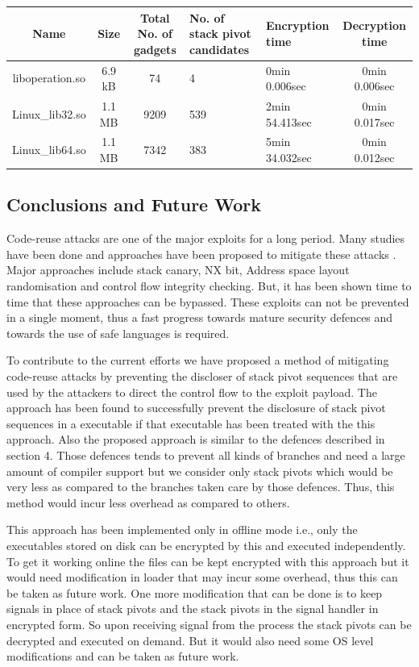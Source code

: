 \documentclass{article}
\begin{document}
\begin{tabular}{|c|c|c|m{2.7cm}|l|c|}
\hline 
Name & Size & Total No. of gadgets & No. of stack pivot candidates & Encryption time & Decryption time \\ 
\hline 
liboperation.so & 6.9 kB & 74 & 4 & 0min 0.006sec & 0min 0.006sec \\ 
\hline 
Linux\_lib32.so & 1.1 MB & 9209 & 539 & 2min 54.413sec & 0min 0.017sec \\ 
\hline 
Linux\_lib64.so & 1.1 MB & 7342 & 383 & 5min 34.032sec & 0min 0.012sec \\ 
\hline 
\end{tabular} 

\begin{multicols}{2}
	\section{Conclusions and Future Work}
	Code-reuse attacks are one of the major exploits for a long period. Many studies have been done and approaches have been proposed to mitigate these attacks \cite{breakdef}\cite{secrvw}\cite{memerr}\cite{marlin}. Major approaches include stack canary, NX bit, Address space layout randomisation and control flow integrity checking. But, it has been shown time to time that these approaches can be bypassed. These exploits can not be prevented in a single moment, thus a fast progress towards mature security defences and towards the use of safe languages is required.
	
	To contribute to the current efforts we have proposed a method of mitigating code-reuse attacks by preventing the discloser of stack pivot sequences that are used by the attackers to direct the control flow to the exploit payload. The approach has been found to successfully prevent the disclosure of stack pivot sequences in a executable if that executable has been treated with the this approach. Also the proposed approach is similar to the defences described in section 4. Those defences tends to prevent all kinds of branches and need a large amount of compiler support but we consider only stack pivots which would be very less as compared to the branches taken care by those defences. Thus, this method would incur less overhead as compared to others.
	
	This approach has been implemented only in offline mode i.e., only the executables stored on disk can be encrypted by this and executed independently. To get it working online the files can be kept encrypted with this approach but it would need modification in loader that may incur some overhead, thus this can be taken as future work. One more modification that can be done is to keep signals in place of stack pivots and the stack pivots in the signal handler in encrypted form. So upon receiving signal from the process the stack pivots can be decrypted and executed on demand. But it would also need some OS level modifications and can be taken as future work.
	
    
    
	
	\end{multicols}
\end{document}
